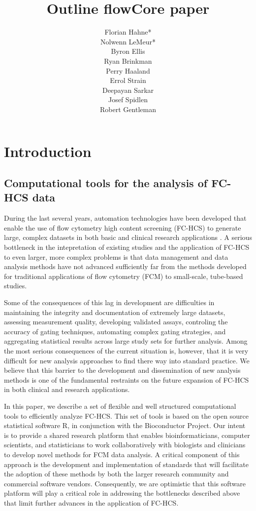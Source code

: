 \documentclass[12pt]{article}
\title{Outline flowCore paper}
\author{Florian Hahne*\\
  Nolwenn LeMeur*\\
  Byron Ellis\\
  Ryan Brinkman\\
  Perry Haaland\\
  Errol Strain\\
  Deepayan Sarkar\\
  Josef Spidlen\\
  Robert Gentleman
 }
\begin{document}
\maketitle

\section*{Introduction}
\subsection*{Computational tools for the analysis of FC-HCS data}
During the last several years, automation technologies have been
developed that enable the use of flow cytometry high content screening
(FC-HCS) to generate large, complex datasets in both basic and
clinical research applications \citep{brinkman2007hcf}. A serious
bottleneck in the intepretation of existing studies and the
application of FC-HCS to even larger, more complex problems is that
data management and data analysis methods have not advanced
sufficiently far from the methods developed for traditional
applications of flow cytometry (FCM) to small-scale, tube-based
studies.

Some of the consequences of this lag in development are difficulties
in maintaining the integrity and documentation of extremely large
datasets, assessing measurement quality, developing validated assays,
controling the accuracy of gating techniques, automating complex gating
strategies, and aggregating statistical results across large study
sets for further analysis.  Among the most serious consequences of the
current situation is, however, that it is very difficult for new
analysis approaches to find there way into standard practice. We
believe that this barrier to the development and dissemination of new
analysis methods is one of the fundamental restraints on the future
expansion of FC-HCS in both clinical and research applications.

In this paper, we describe a set of flexible and well structured
computational tools to efficiently analyze FC-HCS. This set of tools
is based on the open source statistical software R, in conjunction
with the Bioconductor Project. Our intent is to provide a shared
research platform that enables bioinformaticians, computer scientists,
and statisticians to work collaboratively with biologists and
clinicians to develop novel methods \citep{lizard2007fca} for FCM data
analysis. A critical component of this approach is the development and
implementation of standards that will facilitate the adoption of these
methods by both the larger research community and commercial software
vendors.  Consequently, we are optimistic that this software platform
will play a critical role in addressing the bottlenecks described
above that limit further advances in the application of FC-HCS.
\end{document}
